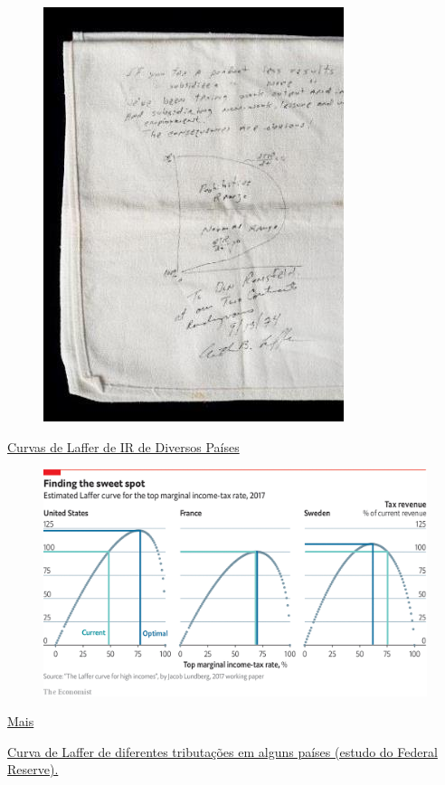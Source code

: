 \documentclass[a4paper,12pt]{article}[abntex2]
\begin{document}
\begin{figure}[H]
    \centering
    \includegraphics[width=0.7\linewidth]{Imagens/a18i15.png}
\end{figure}

\href{https://www.federalreserve.gov/pubs/ifdp/2012/1048/ifdp1048.pdf}{Curvas de Laffer de IR de Diversos Países}

\begin{figure}[H]
    \centering
    \includegraphics[width=0.7\linewidth]{Imagens/a18i16.png}
\end{figure}

\href{https://www.reddit.com/r/dataisbeautiful/comments/7mvec3/laffer_curves_for_27_oecd_countries/}{Mais}

\href{https://www.federalreserve.gov/pubs/ifdp/2012/1048/ifdp1048.pdf}{Curva de Laffer de diferentes tributações em alguns países (estudo do Federal Reserve).}
\end{document}
